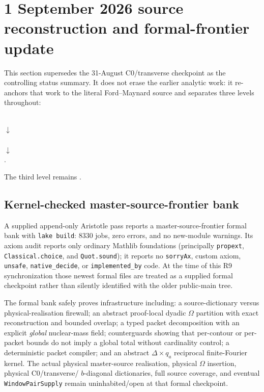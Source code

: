 \section{1 September 2026 source reconstruction and formal-frontier update}\label{sec:sep1source}

This section supersedes the 31-August C0/transverse checkpoint as the controlling status
summary.  It does not erase the earlier analytic work: it re-anchors that work to the
literal Ford--Maynard source and separates three levels throughout:
\begin{center}
\small
{}\\
$\downarrow$\\
\\
$\downarrow$\\
.
\end{center}
The third level remains .

\subsection{Kernel-checked master-source-frontier bank}
A supplied append-only Aristotle pass reports a master-source-frontier formal bank with
\texttt{lake build}: 8330 jobs, zero errors, and no new-module warnings.  Its axiom audit
reports only ordinary Mathlib foundations (principally \texttt{propext},
\texttt{Classical.choice}, and \texttt{Quot.sound}); it reports no \texttt{sorryAx}, custom
axiom, \texttt{unsafe}, \texttt{native\_decide}, or \texttt{implemented\_by} code.
At the time of this R9 synchronization those newest formal files are treated as a supplied
formal checkpoint rather than silently identified with the older public-main tree.

The formal bank safely proves infrastructure including: a source-dictionary versus
physical-realisation firewall; an abstract proof-local dyadic $\Omega$ partition with exact
reconstruction and bounded overlap; a typed packet decomposition with an explicit
\emph{global} nuclear-mass field; counterguards showing that per-contour or per-packet
bounds do not imply a global total without cardinality control; a deterministic packet
compiler; and an abstract $\Delta\times q_a$ reciprocal finite-Fourier kernel.  The actual
physical master-source realisation, physical $\Omega$ insertion, physical C0/transverse/
$b$-diagonal dictionaries, full source coverage, and eventual \texttt{WindowPairSupply}
remain uninhabited/open at that formal checkpoint.

